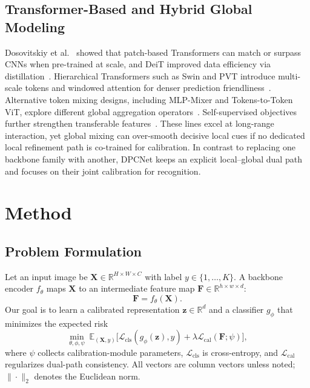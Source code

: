 \documentclass[11pt,a4paper]{article}
\begin{document}
\subsection{Transformer-Based and Hybrid Global Modeling}
Dosovitskiy et al.~\cite{dosovitskiy2021vit} showed that patch-based Transformers can match or surpass CNNs when pre-trained at scale, and DeiT improved data efficiency via distillation~\cite{touvron2021deit}.
Hierarchical Transformers such as Swin and PVT introduce multi-scale tokens and windowed attention for denser prediction friendliness~\cite{liu2021swin,wang2021pvt,liu2022swinv2}.
Alternative token mixing designs, including MLP-Mixer and Tokens-to-Token ViT, explore different global aggregation operators~\cite{tolstikhin2021mlpmixer,yuan2021t2t,chu2021twins}.
Self-supervised objectives further strengthen transferable features~\cite{chen2020simclr,he2020moco,chen2021mocov3,caron2021dino,zhou2022ibot,he2022mae,bao2022beit,oquab2024dinov2}.
These lines excel at long-range interaction, yet global mixing can over-smooth decisive local cues if no dedicated local refinement path is co-trained for calibration.
In contrast to replacing one backbone family with another, DPCNet keeps an explicit local--global dual path and focuses on their joint calibration for recognition.

\section{Method}
\label{sec:method}

\subsection{Problem Formulation}
\label{sec:formulation}
Let an input image be $\mathbf{X}\in\mathbb{R}^{H\times W\times C}$ with label $y\in\{1,\ldots,K\}$.
A backbone encoder $f_{\theta}$ maps $\mathbf{X}$ to an intermediate feature map $\mathbf{F}\in\mathbb{R}^{h\times w\times d}$:
\begin{equation}
\mathbf{F}=f_{\theta}(\mathbf{X}).
\label{eq:backbone}
\end{equation}
Our goal is to learn a calibrated representation $\mathbf{z}\in\mathbb{R}^{d}$ and a classifier $g_{\phi}$ that minimizes the expected risk
\begin{equation}
\min_{\theta,\phi,\psi}\;\mathbb{E}_{(\mathbf{X},y)}\big[\mathcal{L}_{\mathrm{cls}}(g_{\phi}(\mathbf{z}),y)+\lambda\mathcal{L}_{\mathrm{cal}}(\mathbf{F};\psi)\big],
\label{eq:obj}
\end{equation}
where $\psi$ collects calibration-module parameters, $\mathcal{L}_{\mathrm{cls}}$ is cross-entropy, and $\mathcal{L}_{\mathrm{cal}}$ regularizes dual-path consistency.
All vectors are column vectors unless noted; $\|\cdot\|_2$ denotes the Euclidean norm.
\end{document}
